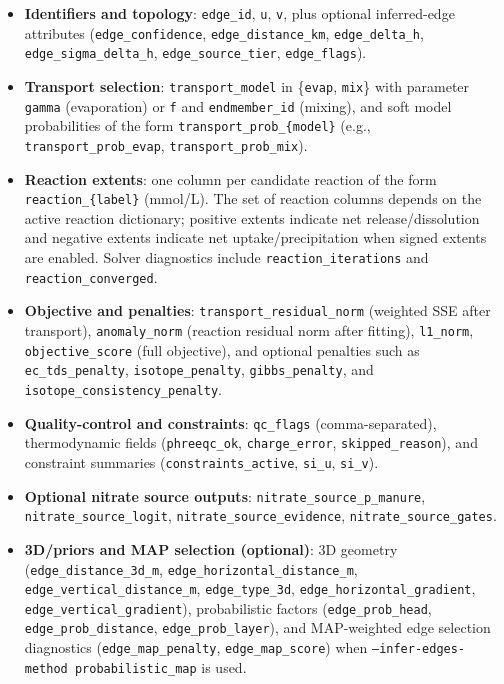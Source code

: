 \documentclass[12pt,a4paper]{article}
\theoremstyle{plain}
\theoremstyle{definition}
\theoremstyle{remark}
\begin{document}
\begin{itemize}
	\item \textbf{Identifiers and topology}: \texttt{edge\_id}, \texttt{u}, \texttt{v}, plus optional inferred-edge attributes (\texttt{edge\_confidence}, \texttt{edge\_distance\_km}, \texttt{edge\_delta\_h}, \texttt{edge\_sigma\_delta\_h}, \texttt{edge\_source\_tier}, \texttt{edge\_flags}).
	\item \textbf{Transport selection}: \texttt{transport\_model} in \{\texttt{evap}, \texttt{mix}\} with parameter \texttt{gamma} (evaporation) or \texttt{f} and \texttt{endmember\_id} (mixing), and soft model probabilities of the form \texttt{transport\_prob\_\{model\}} (e.g., \texttt{transport\_prob\_evap}, \texttt{transport\_prob\_mix}).
	\item \textbf{Reaction extents}: one column per candidate reaction of the form \texttt{reaction\_\{label\}} (mmol/L). The set of reaction columns depends on the active reaction dictionary; positive extents indicate net release/dissolution and negative extents indicate net uptake/precipitation when signed extents are enabled. Solver diagnostics include \texttt{reaction\_iterations} and \texttt{reaction\_converged}.
	\item \textbf{Objective and penalties}: \texttt{transport\_residual\_norm} (weighted SSE after transport), \texttt{anomaly\_norm} (reaction residual norm after fitting), \texttt{l1\_norm}, \texttt{objective\_score} (full objective), and optional penalties such as \texttt{ec\_tds\_penalty}, \texttt{isotope\_penalty}, \texttt{gibbs\_penalty}, and \texttt{isotope\_consistency\_penalty}.
	\item \textbf{Quality-control and constraints}: \texttt{qc\_flags} (comma-separated), thermodynamic fields (\texttt{phreeqc\_ok}, \texttt{charge\_error}, \texttt{skipped\_reason}), and constraint summaries (\texttt{constraints\_active}, \texttt{si\_u}, \texttt{si\_v}).
	\item \textbf{Optional nitrate source outputs}: \texttt{nitrate\_source\_p\_manure}, \texttt{nitrate\_source\_logit}, \texttt{nitrate\_source\_evidence}, \texttt{nitrate\_source\_gates}.
	\item \textbf{3D/priors and MAP selection (optional)}: 3D geometry (\texttt{edge\_distance\_3d\_m}, \texttt{edge\_horizontal\_distance\_m}, \texttt{edge\_vertical\_distance\_m}, \texttt{edge\_type\_3d}, \texttt{edge\_horizontal\_gradient}, \texttt{edge\_vertical\_gradient}), probabilistic factors (\texttt{edge\_prob\_head}, \texttt{edge\_prob\_distance}, \texttt{edge\_prob\_layer}), and MAP-weighted edge selection diagnostics (\texttt{edge\_map\_penalty}, \texttt{edge\_map\_score}) when \texttt{--infer-edges-method probabilistic\_map} is used.

\end{itemize}
\end{document}
